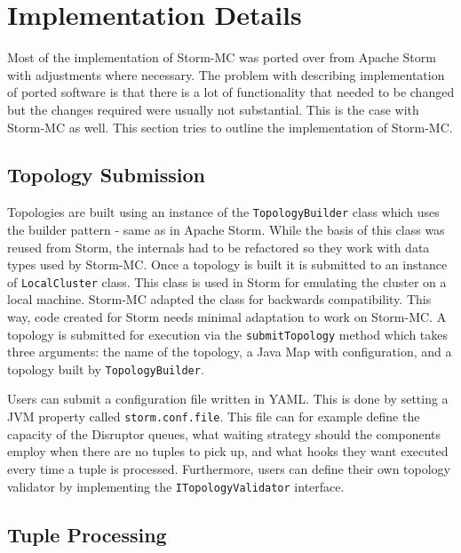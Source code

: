 \documentclass[bsc,logo,frontabs,twoside,singlespacing,normalheadings,parskip]{infthesis}\usepackage[]{graphicx}\usepackage[]{color}
\begin{document}
\section{Implementation Details}
\label{sec:implementation}

Most of the implementation of Storm-MC was ported over from Apache Storm with adjustments where necessary. The problem with describing implementation of ported software is that there is a lot of functionality that needed to be changed but the changes required were usually not substantial. This is the case with Storm-MC as well. This section tries to outline the implementation of Storm-MC.

\subsection{Topology Submission}

Topologies are built using an instance of the \texttt{TopologyBuilder} class which uses the builder pattern - same as in Apache Storm. While the basis  of this class was reused from Storm, the internals had to be refactored so they work with data types used by Storm-MC. Once a topology is built it is submitted to an instance of \texttt{LocalCluster} class. This class is used in Storm for emulating the cluster on a local machine. Storm-MC adapted the class for backwards compatibility. This way, code created for Storm needs minimal adaptation to work on Storm-MC. A topology is submitted for execution via the \texttt{submitTopology} method which takes three arguments: the name of the topology, a Java Map with configuration, and a topology built by \texttt{TopologyBuilder}.

Users can submit a configuration file written in YAML. This is done by setting a JVM property called \texttt{storm.conf.file}. This file can for example define the capacity of the Disruptor queues, what waiting strategy should the components employ when there are no tuples to pick up, and what hooks they want executed every time a tuple is processed. Furthermore, users can define their own topology validator by implementing the \texttt{ITopologyValidator} interface.

\subsection{Tuple Processing}
\end{document}
